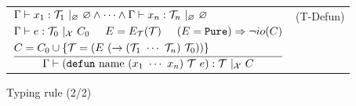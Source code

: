 \documentclass{article}
\begin{document}
\begin{figure}[tb]
\begin{tabular}{rlrl}
        \multicolumn{3}{r}{
            $\dfrac{
                \begin{aligned}
                    &\Gamma \vdash x_1 : \mathcal{T}_1\ |_\varnothing\ \varnothing \land \cdots \land \Gamma \vdash x_n : \mathcal{T}_n\ |_\varnothing\ \varnothing \\
                    &\Gamma \vdash e : \mathcal{T}_0\ |_{\mathcal{X}}\ C_0 \hspace{5mm} E = E_\mathcal{T}(\mathcal{T}) \hspace{5mm} (E = \mathtt{Pure}) \Rightarrow \neg io(C)\\
                    &C = C_0 \cup \{\mathcal{T} = (E\ (\rightarrow (\mathcal{T}_1\ \cdots\ \mathcal{T}_n)\ \mathcal{T}_0)) \}
                \end{aligned}
            }{
                \Gamma \vdash (\mathtt{defun}\ \mathrm{name}\ (x_1\ \cdots\ x_n)\ \mathcal{T}\ e) : \mathcal{T}\ |_\mathcal{X}\ C
            }$
        } & (T-Defun)
    \end{tabular}
    \caption{Typing rule (2/2)}
    \label{fig:typing2}
\end{figure}
\end{document}

